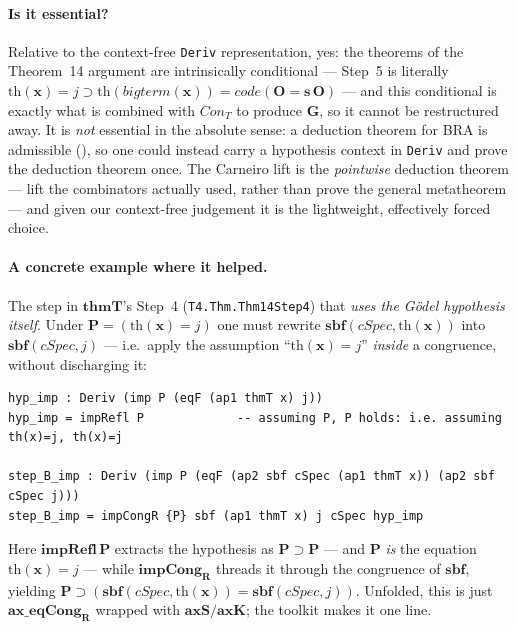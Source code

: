 \documentclass[11pt]{article}
\theoremstyle{plain}
\theoremstyle{definition}
\theoremstyle{remark}
\newcommand{\code}[1]{\mathit{code}(#1)}
\newcommand{\sbf}{\mathbf{sbf}}
\newcommand{\thmT}{\mathbf{thmT}}
\newcommand{\Con}{\mathit{Con}}
\begin{document}
\paragraph{Is it essential?}  Relative to the context-free
\verb|Deriv| representation, yes: the theorems of the Theorem~14
argument are intrinsically conditional --- Step~5 is literally
$\mathrm{th}(\mathbf{x}) = j \supset \mathrm{th}(\mathit{bigterm}(\mathbf{x}))
= \code{\mathbf{O}=\mathbf{s}\,\mathbf{O}}$ --- and this conditional is
exactly what is combined with $\Con_T$ to produce $\mathbf{G}$, so it
cannot be restructured away.  It is \emph{not} essential in the absolute
sense: a deduction theorem for BRA is admissible (\cite[Exercise~19]{Guard1963}),
so one could instead carry a hypothesis context in \verb|Deriv| and prove
the deduction theorem once.  The Carneiro lift is the \emph{pointwise}
deduction theorem --- lift the combinators actually used, rather than
prove the general metatheorem --- and given our context-free judgement it
is the lightweight, effectively forced choice.

\paragraph{A concrete example where it helped.}  The step in
$\thmT$'s Step~4 (\verb|T4.Thm.Thm14Step4|) that \emph{uses the
G\"odel hypothesis itself}.  Under $\mathbf{P} = (\mathrm{th}(\mathbf{x})
= j)$ one must rewrite $\sbf(\mathit{cSpec}, \mathrm{th}(\mathbf{x}))$
into $\sbf(\mathit{cSpec}, j)$ --- i.e.\ apply the assumption
``$\mathrm{th}(\mathbf{x}) = j$'' \emph{inside} a congruence, without
discharging it:
\begin{lstlisting}
hyp_imp : Deriv (imp P (eqF (ap1 thmT x) j))
hyp_imp = impRefl P             -- assuming P, P holds: i.e. assuming th(x)=j, th(x)=j

step_B_imp : Deriv (imp P (eqF (ap2 sbf cSpec (ap1 thmT x)) (ap2 sbf cSpec j)))
step_B_imp = impCongR {P} sbf (ap1 thmT x) j cSpec hyp_imp
\end{lstlisting}
Here $\mathbf{impRefl}\,\mathbf{P}$ extracts the hypothesis as
$\mathbf{P} \supset \mathbf{P}$ --- and $\mathbf{P}$ \emph{is} the
equation $\mathrm{th}(\mathbf{x}) = j$ --- while $\mathbf{impCong_R}$
threads it through the congruence of $\sbf$, yielding
$\mathbf{P} \supset (\sbf(\mathit{cSpec}, \mathrm{th}(\mathbf{x})) =
\sbf(\mathit{cSpec}, j))$.  Unfolded, this is just $\mathbf{ax\_eqCong_R}$
wrapped with $\mathbf{axS}/\mathbf{axK}$; the toolkit makes it one line.
\end{document}
